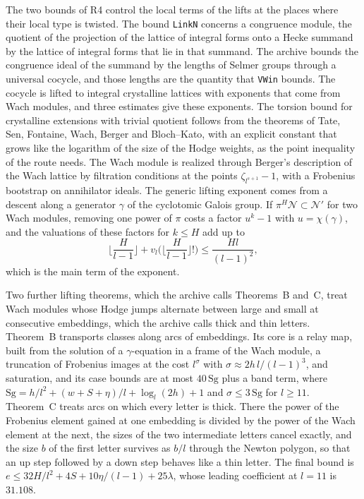 \documentclass[11pt,letterpaper]{article}
\numberwithin{equation}{section}
\begin{document}
The two bounds of R4 control the local terms of the lifts at the places where their local type is twisted. The bound \texttt{LinkN} concerns a congruence module, the quotient of the projection of the lattice of integral forms onto a Hecke summand by the lattice of integral forms that lie in that summand. The archive bounds the congruence ideal of the summand by the lengths of Selmer groups through a universal cocycle, and those lengths are the quantity that \texttt{VWin} bounds. The cocycle is lifted to integral crystalline lattices with exponents that come from Wach modules, and three estimates give these exponents. The torsion bound for crystalline extensions with trivial quotient follows from the theorems of Tate, Sen, Fontaine, Wach, Berger and Bloch--Kato, with an explicit constant that grows like the logarithm of the size of the Hodge weights, as the point inequality of the route needs. The Wach module is realized through Berger's description of the Wach lattice by filtration conditions at the points $\zeta_{l^{s+1}}-1$, with a Frobenius bootstrap on annihilator ideals. The generic lifting exponent comes from a descent along a generator $\gamma$ of the cyclotomic Galois group. If $\pi^H\mathcal N\subset\mathcal N'$ for two Wach modules, removing one power of $\pi$ costs a factor $u^k-1$ with $u=\chi(\gamma)$, and the valuations of these factors for $k\le H$ add up to
\[
\Big\lfloor\frac H{l-1}\Big\rfloor+v_l\Big(\Big\lfloor\frac H{l-1}\Big\rfloor!\Big)\le\frac{Hl}{(l-1)^2},
\]
which is the main term of the exponent.

Two further lifting theorems, which the archive calls Theorems~B and~C, treat Wach modules whose Hodge jumps alternate between large and small at consecutive embeddings, which the archive calls thick and thin letters. Theorem~B transports classes along arcs of embeddings. Its core is a relay map, built from the solution of a $\gamma$-equation in a frame of the Wach module, a truncation of Frobenius images at the cost $l^\sigma$ with $\sigma\approx2h\,l/(l-1)^3$, and saturation, and its case bounds are at most $40\,\mathrm{Sg}$ plus a band term, where $\mathrm{Sg}=h/l^2+(w+S+\eta)/l+\log_l(2h)+1$ and $\sigma\le3\,\mathrm{Sg}$ for $l\ge11$. Theorem~C treats arcs on which every letter is thick. There the power of the Frobenius element gained at one embedding is divided by the power of the Wach element at the next, the sizes of the two intermediate letters cancel exactly, and the size $b$ of the first letter survives as $b/l$ through the Newton polygon, so that an up step followed by a down step behaves like a thin letter. The final bound is $e\le32H/l^2+4S+10\eta/(l-1)+25\lambda$, whose leading coefficient at $l=11$ is $31.108$.
\end{document}
